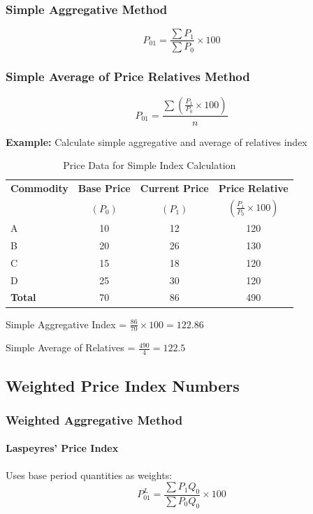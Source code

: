 \documentclass[twoside]{book}
\begin{document}
\subsubsection{Simple Aggregative Method}
\begin{equation}
    P_{01} = \frac{\sum P_1}{\sum P_0} \times 100
\end{equation}

\subsubsection{Simple Average of Price Relatives Method}
\begin{equation}
    P_{01} = \frac{\sum \left(\frac{P_1}{P_0} \times 100\right)}{n}
\end{equation}

\textbf{Example:} Calculate simple aggregative and average of relatives index

\begin{table}[h]
\centering
\caption{Price Data for Simple Index Calculation}
\begin{tabular}{lccc}
\toprule
\textbf{Commodity} & \textbf{Base Price} & \textbf{Current Price} & \textbf{Price Relative} \\
 & $(P_0)$ & $(P_1)$ & $\left(\frac{P_1}{P_0} \times 100\right)$ \\
\midrule
A & 10 & 12 & 120 \\
B & 20 & 26 & 130 \\
C & 15 & 18 & 120 \\
D & 25 & 30 & 120 \\
\midrule
\textbf{Total} & 70 & 86 & 490 \\
\bottomrule
\end{tabular}
\end{table}

Simple Aggregative Index = $\frac{86}{70} \times 100 = 122.86$

Simple Average of Relatives = $\frac{490}{4} = 122.5$

\subsection{Weighted Price Index Numbers}

\subsubsection{Weighted Aggregative Method}

\paragraph{Laspeyres' Price Index}
Uses base period quantities as weights:
\begin{equation}
    P_{01}^L = \frac{\sum P_1 Q_0}{\sum P_0 Q_0} \times 100
\end{equation}
\end{document}
